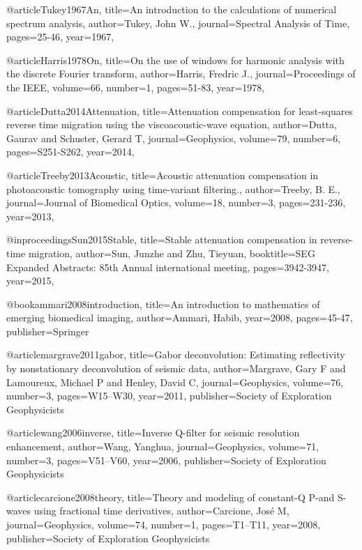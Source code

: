 @article{Tukey1967An,
  title={An introduction to the calculations of numerical spectrum analysis},
  author={Tukey, John W.},
  journal={Spectral Analysis of Time},
  pages={25-46},
  year={1967},
}

@article{Harris1978On,
  title={On the use of windows for harmonic analysis with the discrete {F}ourier transform},
  author={Harris, Fredric J.},
  journal={Proceedings of the IEEE},
  volume={66},
  number={1},
  pages={51-83},
  year={1978},
}

@article{Dutta2014Attenuation,
  title={Attenuation compensation for least-squares reverse time migration using the viscoacoustic-wave equation},
  author={Dutta, Gaurav and Schuster, Gerard T},
  journal={Geophysics},
  volume={79},
  number={6},
  pages={S251-S262},
  year={2014},
}

@article{Treeby2013Acoustic,
  title={Acoustic attenuation compensation in photoacoustic tomography using time-variant filtering.},
  author={Treeby, B. E.},
  journal={Journal of Biomedical Optics},
  volume={18},
  number={3},
  pages={231-236},
  year={2013},
}

@inproceedings{Sun2015Stable,
  title={Stable attenuation compensation in reverse-time migration},
  author={Sun, Junzhe and Zhu, Tieyuan},
  booktitle={SEG Expanded Abstracts: 85th Annual international meeting},
  pages={3942-3947},
  year={2015},
}

@book{ammari2008introduction,
  title={An introduction to mathematics of emerging biomedical imaging},
  author={Ammari, Habib},
  year={2008},
  pages={45-47},
  publisher={Springer}
}


@article{margrave2011gabor,
  title={Gabor deconvolution: Estimating reflectivity by nonstationary deconvolution of seismic data},
  author={Margrave, Gary F and Lamoureux, Michael P and Henley, David C},
  journal={Geophysics},
  volume={76},
  number={3},
  pages={W15--W30},
  year={2011},
  publisher={Society of Exploration Geophysicists}
}

@article{wang2006inverse,
  title={Inverse {Q}-filter for seismic resolution enhancement},
  author={Wang, Yanghua},
  journal={Geophysics},
  volume={71},
  number={3},
  pages={V51--V60},
  year={2006},
  publisher={Society of Exploration Geophysicists}
}

@article{carcione2008theory,
  title={Theory and modeling of constant-{Q} {P}-and {S}-waves using fractional time derivatives},
  author={Carcione, Jos{\'e} M},
  journal={Geophysics},
  volume={74},
  number={1},
  pages={T1--T11},
  year={2008},
  publisher={Society of Exploration Geophysicists}
}


